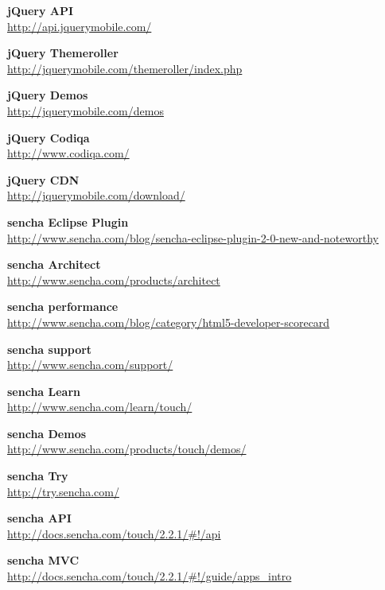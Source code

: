\documentclass[a4paper,12pt]{book}
\begin{document}
\begin{thebibliography}{25}
\textbf{jQuery API}\\
{\footnotesize\url{http://api.jquerymobile.com/}}

\textbf{jQuery Themeroller}\\
{\footnotesize\url{http://jquerymobile.com/themeroller/index.php}}

\textbf{jQuery Demos}\\
{\footnotesize\url{http://jquerymobile.com/demos}}

\textbf{jQuery Codiqa}\\
{\footnotesize\url{http://www.codiqa.com/}}

\textbf{jQuery CDN}\\
{\footnotesize\url{http://jquerymobile.com/download/}}

\textbf{sencha Eclipse Plugin}\\
{\footnotesize\url{http://www.sencha.com/blog/sencha-eclipse-plugin-2-0-new-and-noteworthy}}

\textbf{sencha Architect}\\
{\footnotesize\url{http://www.sencha.com/products/architect}}

\textbf{sencha performance}\\
{\footnotesize\url{http://www.sencha.com/blog/category/html5-developer-scorecard}}

\textbf{sencha support}\\
{\footnotesize\url{http://www.sencha.com/support/}}

\textbf{sencha Learn}\\
{\footnotesize\url{http://www.sencha.com/learn/touch/}}

\textbf{sencha Demos}\\
{\footnotesize\url{http://www.sencha.com/products/touch/demos/}}

\textbf{sencha Try}\\
{\footnotesize\url{http://try.sencha.com/}}

\textbf{sencha API}\\
{\footnotesize\url{http://docs.sencha.com/touch/2.2.1/#!/api}}

\textbf{sencha MVC}\\
{\footnotesize\url{http://docs.sencha.com/touch/2.2.1/#!/guide/apps_intro}}


\end{thebibliography}
\end{document}
